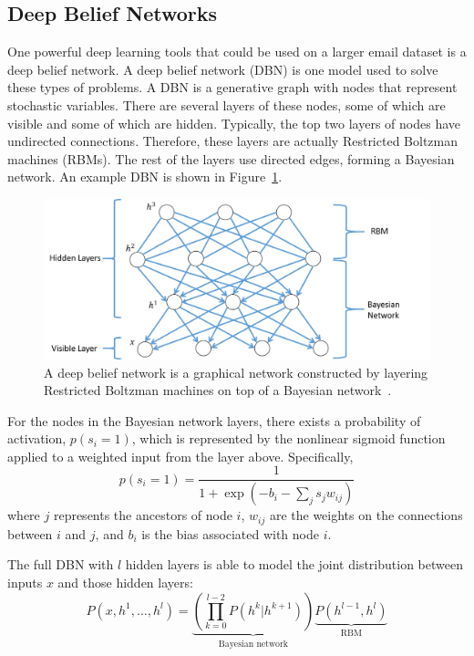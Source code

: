 \documentclass[12pt]{report}
\begin{document}
\subsection{Deep Belief Networks}
One powerful deep learning tools that could be used on a larger email dataset is a deep belief network.
A deep belief network (DBN) is one model used to solve these types of problems. 
A DBN is a generative graph with nodes that represent stochastic variables.
There are several layers of these nodes, some of which are visible and some of which are hidden.
Typically, the top two layers of nodes have undirected connections.
Therefore, these layers are actually Restricted Boltzman machines (RBMs).
The rest of the layers use directed edges, forming a Bayesian network.
An example DBN is shown in Figure~\ref{fig:DBN}.

\begin{figure}[t]
    \centering
        \includegraphics[width=.7\columnwidth,trim={0mm 0mm 0mm 0mm},clip]{dbn}
        \vspace{-7pt}
        \caption[The Components of a Deep Belief Network]{A deep belief network is a graphical network constructed by layering Restricted Boltzman machines on top of a Bayesian network~\cite{hinton_fast_2006}.}
        \label{fig:DBN}
\end{figure}

For the nodes in the Bayesian network layers, there exists a probability of activation, $p(s_i=1)$, which is represented by the nonlinear sigmoid function applied to a weighted input from the layer above.
Specifically,
\begin{equation}
p(s_i=1) = \frac{1}{1+\exp \left(-b_i-\sum_j s_j w_{ij}\right)}
\end{equation}
where $j$ represents the ancestors of node $i$, $w_{ij}$ are the weights on the connections between $i$ and $j$, and $b_i$ is the bias associated with node $i$.

The full DBN with $l$ hidden layers is able to model the joint distribution between inputs $x$ and those hidden layers:
\begin{equation}
P(x, h^1, ..., h^l) = \underbrace{\left(\prod_{k=0}^{l-2}P(h^k|h^{k+1}) \right)}_{\text{Bayesian network}} \underbrace{P(h^{l-1},h^l)}_{\text{RBM}}
\end{equation}
\end{document}
